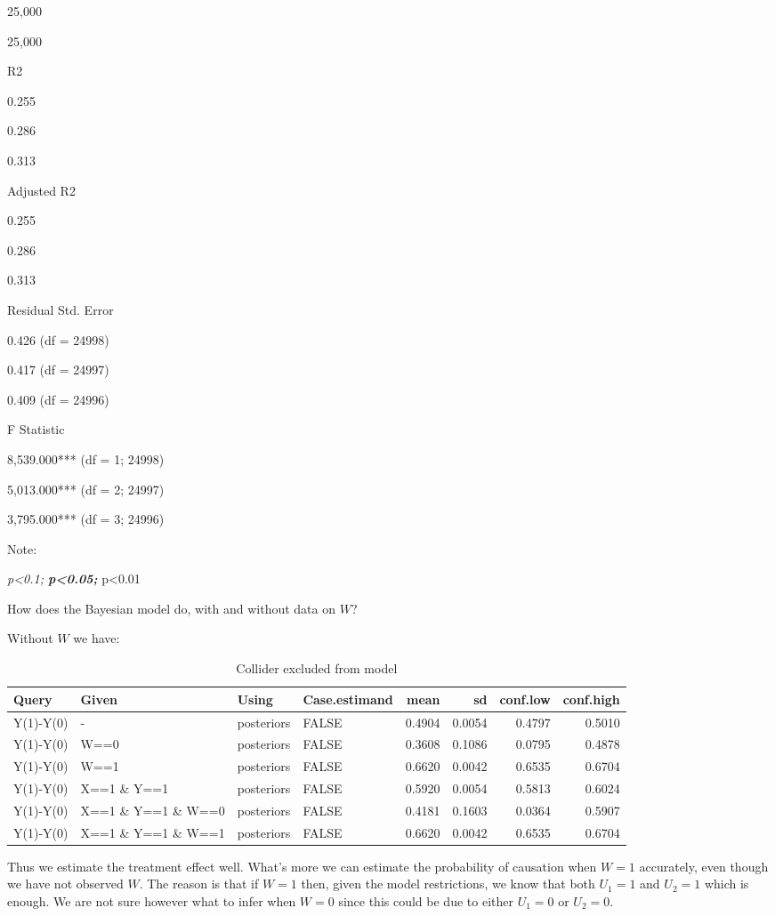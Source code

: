 \documentclass[
  12pt,
]{book}
\begin{document}
25,000

25,000

R2

0.255

0.286

0.313

Adjusted R2

0.255

0.286

0.313

Residual Std. Error

0.426 (df = 24998)

0.417 (df = 24997)

0.409 (df = 24996)

F Statistic

8,539.000*** (df = 1; 24998)

5,013.000*** (df = 2; 24997)

3,795.000*** (df = 3; 24996)

Note:

\emph{p\textless0.1; \textbf{p\textless0.05; }}p\textless0.01

How does the Bayesian model do, with and without data on \(W\)?

Without \(W\) we have:

\begin{table}

\caption{\label{tab:applearncoll6}Collider excluded from model}
\centering
\begin{tabular}[t]{l|l|l|l|r|r|r|r}
\hline
Query & Given & Using & Case.estimand & mean & sd & conf.low & conf.high\\
\hline
Y(1)-Y(0) & - & posteriors & FALSE & 0.4904 & 0.0054 & 0.4797 & 0.5010\\
\hline
Y(1)-Y(0) & W==0 & posteriors & FALSE & 0.3608 & 0.1086 & 0.0795 & 0.4878\\
\hline
Y(1)-Y(0) & W==1 & posteriors & FALSE & 0.6620 & 0.0042 & 0.6535 & 0.6704\\
\hline
Y(1)-Y(0) & X==1 \& Y==1 & posteriors & FALSE & 0.5920 & 0.0054 & 0.5813 & 0.6024\\
\hline
Y(1)-Y(0) & X==1 \& Y==1 \& W==0 & posteriors & FALSE & 0.4181 & 0.1603 & 0.0364 & 0.5907\\
\hline
Y(1)-Y(0) & X==1 \& Y==1 \& W==1 & posteriors & FALSE & 0.6620 & 0.0042 & 0.6535 & 0.6704\\
\hline
\end{tabular}
\end{table}

Thus we estimate the treatment effect well. What's more we can estimate the probability of causation when \(W=1\) accurately, even though we have not observed \(W\). The reason is that if \(W=1\) then, given the model restrictions, we know that both \(U_1=1\) and \(U_2=1\) which is enough. We are not sure however what to infer when \(W=0\) since this could be due to either \(U_1=0\) or \(U_2=0\).
\end{document}
